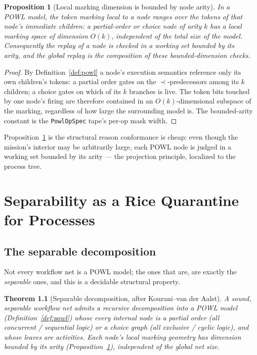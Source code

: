 \documentclass[11pt,oneside]{book}
\theoremstyle{definition}
\theoremstyle{plain}
\newtheorem{theorem}{Theorem}[chapter]
\newtheorem{proposition}[theorem]{Proposition}
\theoremstyle{remark}
\newcommand{\code}[1]{\texttt{#1}}
\begin{document}
\begin{proposition}[Local marking dimension is bounded by node arity]\label{prop:local}
In a POWL model, the token marking local to a node ranges over the tokens of that node's
immediate children: a partial-order or choice node of arity $k$ has a local marking space of
dimension $O(k)$, independent of the total size of the model. Consequently the replay of a
node is checked in a working set bounded by its arity, and the global replay is the composition
of these bounded-dimension checks.
\end{proposition}

\begin{proof}
By Definition~\ref{def:powl} a node's execution semantics reference only its own children's
tokens: a partial order gates on the $\prec$-predecessors among its $k$ children; a choice
gates on which of its $k$ branches is live. The token bits touched by one node's firing are
therefore contained in an $O(k)$-dimensional subspace of the marking, regardless of how large
the surrounding model is. The bounded-arity constant is the \code{PowlOpSpec} tape's per-op
mask width. \end{proof}

Proposition~\ref{prop:local} is the structural reason conformance is cheap: even though the
mission's interior may be arbitrarily large, each POWL node is judged in a working set bounded
by its arity --- the projection principle, localized to the process tree.

\chapter{Separability as a Rice Quarantine for Processes}
\label{ch:sep}

\section{The separable decomposition}

Not every workflow net is a POWL model; the ones that are, are exactly the \emph{separable}
ones, and this is a decidable structural property.

\begin{theorem}[Separable decomposition, after Kourani--van der Aalst]\label{thm:sep}
A sound, separable workflow net admits a recursive decomposition into a POWL model
(Definition~\ref{def:powl}) whose every internal node is a partial order (all concurrent /
sequential logic) or a choice graph (all exclusive / cyclic logic), and whose leaves are
activities. Each node's local marking geometry has dimension bounded by its arity
(Proposition~\ref{prop:local}), independent of the global net size.
\end{theorem}
\end{document}
